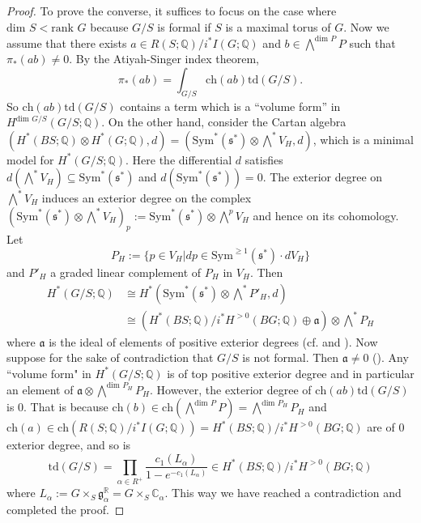 \documentclass[11pt]{amsart}
\theoremstyle{plain}
\theoremstyle{definition}
\begin{document}
\begin{proof}
		To prove the converse, it suffices to focus on the case where $\text{dim }S<\text{rank }G$ because $G/S$ is formal if $S$ is a maximal torus of $G$. Now we assume that there exists $a\in R(S; \mathbb{Q})/i^*I(G; \mathbb{Q})$ and $b\in \bigwedge\nolimits^{\text{dim }P}P$ such that $\pi_*(ab)\neq 0$. By the Atiyah-Singer index theorem, 
		\[\pi_*(ab)=\int_{G/S}\text{ch}(ab)\text{td}(G/S).\] 
		So $\text{ch}(ab)\text{td}(G/S)$ contains a term which is a ``volume form'' in $H^{\text{dim }G/S}(G/S; \mathbb{Q})$. On the other hand, consider the Cartan algebra $(H^*(BS; \mathbb{Q})\otimes H^*(G; \mathbb{Q}), d)=(\text{Sym}^*(\mathfrak{s}^*)\otimes \bigwedge\nolimits^*V_H, d)$, which is a minimal model for $H^*(G/S; \mathbb{Q})$. Here the differential $d$ satisfies $d(\bigwedge\nolimits^*V_H)\subseteq \text{Sym}^*(\mathfrak{s}^*)$ and $d(\text{Sym}^*(\mathfrak{s}^*))=0$. The exterior degree on $\bigwedge\nolimits^*V_H$ induces an exterior degree on the complex $(\text{Sym}^*(\mathfrak{s}^*)\otimes\bigwedge\nolimits^*V_H)_p:=\text{Sym}^*(\mathfrak{s}^*)\otimes\bigwedge\nolimits^p V_H$ and hence on its cohomology. Let 
		\[P_H:=\{p\in V_H| dp\in \text{Sym}^{\geq 1}(\mathfrak{s}^*)\cdot dV_H\}\]
		and $P'_H$ a graded linear complement of $P_H$ in $V_H$. Then 
		\begin{align*}
			H^*(G/S; \mathbb{Q})&\cong H^*(\text{Sym}^*(\mathfrak{s}^*)\otimes\bigwedge\nolimits^* P'_H, d)\\
							&\cong (H^*(BS; \mathbb{Q})/i^*H^{>0}(BG; \mathbb{Q})\oplus \mathfrak{a})\otimes \bigwedge\nolimits^* P_H
		\end{align*}
		where $\mathfrak{a}$ is the ideal of elements of positive exterior degrees (cf. \cite[pp. 73, 83, 52]{GHV} and \cite[Theorem 2.6]{CFok}). Now suppose for the sake of contradiction that $G/S$ is not formal. Then $\mathfrak{a}\neq 0$ (\cite[Theorem 2.6]{CFok}). Any ``volume form" in $H^*(G/S; \mathbb{Q})$ is of top positive exterior degree and in particular an element of $\mathfrak{a}\otimes \bigwedge\nolimits^{\text{dim }P_H}P_H$. However, the exterior degree of $\text{ch}(ab)\text{td}(G/S)$ is 0. That is because $\text{ch}(b)\in \text{ch}(\bigwedge\nolimits^{\text{dim }P}P)=\bigwedge\nolimits^{\text{dim }P_H}P_H$ and $\text{ch}(a)\in \text{ch}(R(S; \mathbb{Q})/i^*I(G; \mathbb{Q}))=H^*(BS; \mathbb{Q})/i^*H^{>0}(BG; \mathbb{Q})$ are of 0 exterior degree, and so is
		\[\text{td}(G/S)=\prod_{\alpha\in R^+}\frac{c_1(L_\alpha)}{1-e^{-c_1(L_\alpha)}}\in H^*(BS; \mathbb{Q})/i^* H^{>0}(BG; \mathbb{Q})\]
		where $L_\alpha:=G\times_S\mathfrak{g}_\alpha^{\mathbb{R}}=G\times_S\mathbb{C}_\alpha$. This way we have reached a contradiction and completed the proof.
	\end{proof}
\end{document}
